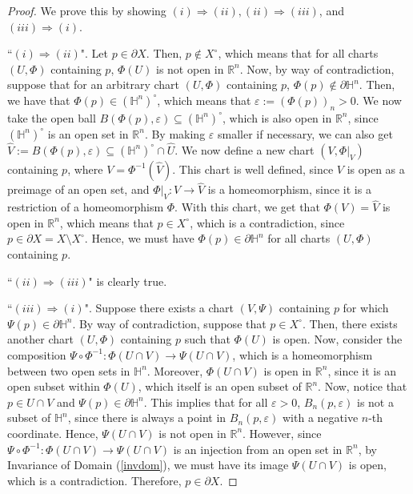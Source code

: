 \documentclass{article}
\renewcommand{\implies}{\Rightarrow}
\newcommand{\R}{\mathbb{R}}
\renewcommand{\H}{\mathbb{H}}
\newcommand{\bdr}{\partial}
\theoremstyle{plain} %
\numberwithin{thm}{section} %
\theoremstyle{definition} %
\begin{document}
\begin{proof}
We prove this by showing $(i) \implies (ii), (ii) \implies (iii)$, and $(iii) \implies (i)$.

``$(i) \implies (ii)$". Let $p \in \bdr X$. Then, $p \notin X^\circ$, which means that for all charts $(U, \Phi)$ containing $p$, $\Phi(U)$ is not open in $\R^n$. Now, by way of contradiction, suppose that for an arbitrary chart $(U, \Phi)$ containing $p$, $\Phi(p) \notin \bdr \H^n$. Then, we have that $\Phi(p) \in (\H^n)^\circ$, which means that $\varepsilon := (\Phi(p))_n > 0$. We now take the open ball $B(\Phi(p), \varepsilon) \subseteq (\H^n)^\circ$, which is also open in $\R^n$, since $(\H^n)^\circ$ is an open set in $\R^n$. By making $\varepsilon$ smaller if necessary, we can also get $\widehat{V} := B(\Phi(p), \varepsilon) \subseteq (\H^n)^\circ \cap \widehat{U}$. We now define a new chart $(V, \Phi|_V)$ containing $p$, where $V = \Phi^{-1}(\widehat{V})$. This chart is well defined, since $V$ is open as a preimage of an open set, and $\Phi|_V: V \to \widehat{V}$ is a homeomorphism, since it is a restriction of a homeomorphism $\Phi$. With this chart, we get that $\Phi(V) = \widehat{V}$ is open in $\R^n$, which means that $p \in X^\circ$, which is a contradiction, since $p \in \bdr X = X \setminus X^\circ$. Hence, we must have $\Phi(p) \in \bdr \H^n$ for all charts $(U, \Phi)$ containing $p$.

``$(ii) \implies (iii)$" is clearly true.

``$(iii) \implies (i)$". Suppose there exists a chart $(V, \Psi)$ containing $p$ for which $\Psi(p) \in \bdr\H^n$. By way of contradiction, suppose that $p \in X^\circ$. Then, there exists another chart $(U, \Phi)$ containing $p$ such that $\Phi(U)$ is open. Now, consider the composition $\Psi \circ \Phi^{-1}: \Phi(U \cap V) \to \Psi(U \cap V)$, which is a homeomorphism between two open sets in $\H^n$. Moreover, $\Phi(U \cap V)$ is open in $\R^n$, since it is an open subset within $\Phi(U)$, which itself is an open subset of $\R^n$. Now, notice that $p \in U \cap V$ and $\Psi(p) \in \bdr\H^n$. This implies that for all $\varepsilon > 0$, $B_n(p, \varepsilon)$ is not a subset of $\H^n$, since there is always a point in $B_n(p, \varepsilon)$ with a negative $n$-th coordinate. Hence, $\Psi(U \cap V)$ is not open in $\R^n$. However, since $\Psi \circ \Phi^{-1}: \Phi(U \cap V) \to \Psi(U \cap V)$ is an injection from an open set in $\R^n$, by Invariance of Domain (\ref{invdom}), we must have its image $\Psi(U \cap V)$ is open, which is a contradiction. Therefore, $p \in \bdr X$.
\end{proof}
\end{document}
